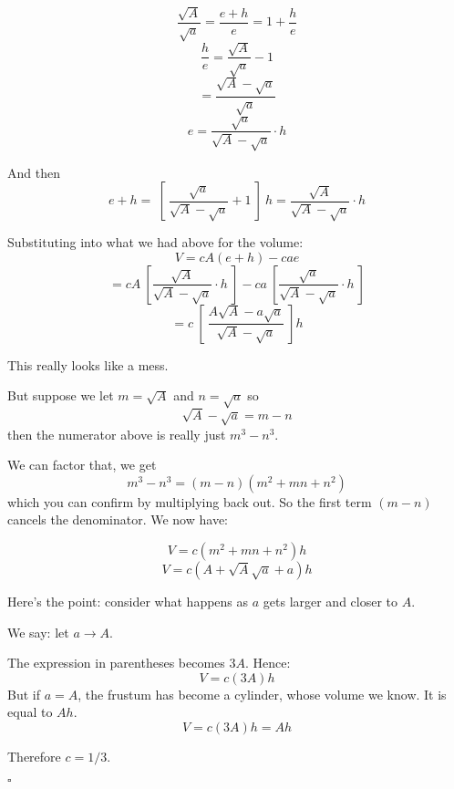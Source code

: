 \documentclass[11pt, oneside]{article}
\begin{document}
\[ \frac{\sqrt{A}}{\sqrt{a}} = \frac{e + h}{e} = 1 + \frac{h}{e} \]
\[ \frac{h}{e} = \frac{\sqrt{A}}{\sqrt{a}} - 1 \]
\[ = \frac{\sqrt{A} - \sqrt{a}}{\sqrt{a}} \]
\[ e = \frac{\sqrt{a}}{\sqrt{A} - \sqrt{a}} \cdot h \]

And then
\[ e + h = \ [ \  \frac{\sqrt{a}}{\sqrt{A} - \sqrt{a}} + 1 \ ] \ h =\frac{\sqrt{A}}{\sqrt{A} - \sqrt{a}} \cdot h \]

Substituting into what we had above for the volume:
\[ V = cA(e+h) - cae \]
\[ = cA \ [ \frac{\sqrt{A}}{\sqrt{A} - \sqrt{a}} \cdot h \ ] - ca \ [ \frac{\sqrt{a}}{\sqrt{A} - \sqrt{a}}  \cdot h \ ] \]
\[ = c \ [ \   \frac{A \sqrt{A} - a \sqrt{a}}{\sqrt{A} - \sqrt{a}} \ ] h \]

This really looks like a mess.  

But suppose we let $m =  \sqrt{A}$ and $n =  \sqrt{a}$ so
\[ \sqrt{A} - \sqrt{a} = m - n \]
then the numerator above is really just $m^3 - n^3$.    

We can factor that, we get 
\[ m^3 - n^3 = (m-n)(m^2 + mn + n^2) \]
which you can confirm by multiplying back out.  So the first term $(m-n)$ cancels the denominator.  We now have:

\[ V = c (m^2 + mn + n^2) h \]
\[ V = c (A + \sqrt{A} \sqrt{a} + a) h \]

Here's the point:  consider what happens as $a$ gets larger and closer to $A$.

We say:  let $a \rightarrow A$.

The expression in parentheses becomes $3A$.  Hence:
\[ V = c(3A)h \]
But if $a = A$, the frustum has become a cylinder, whose volume we know.  It is equal to $Ah$. 
\[ V = c(3A)h = Ah \]

Therefore $c = 1/3$.

$\square$
\end{document}

